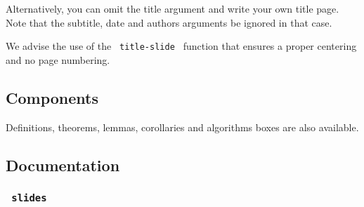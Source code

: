 Alternatively, you can omit the title argument and write your own title
page. Note that the subtitle, date and authors arguments be ignored in
that case.

\begin{Shaded}
\begin{Highlighting}[]
\NormalTok{)}

\NormalTok{\#align(center + horizon)[}
\NormalTok{]}

\end{Highlighting}
\end{Shaded}

We advise the use of the \texttt{\ title-slide\ } function that ensures
a proper centering and no page numbering.

\begin{Shaded}
\begin{Highlighting}[]

\NormalTok{\#title{-}slide(layout: "medium")[}
\NormalTok{]}

\end{Highlighting}
\end{Shaded}

\subsection{Components}\label{components}

Definitions, theorems, lemmas, corollaries and algorithms boxes are also
available.

\begin{Shaded}
\begin{Highlighting}[]
\NormalTok{\#definition(title: "An interesting definition")[}
\NormalTok{]}
\end{Highlighting}
\end{Shaded}

\subsection{Documentation}\label{documentation}

\subsubsection{\texorpdfstring{\texttt{\ slides\ }}{ slides }}\label{slides}

